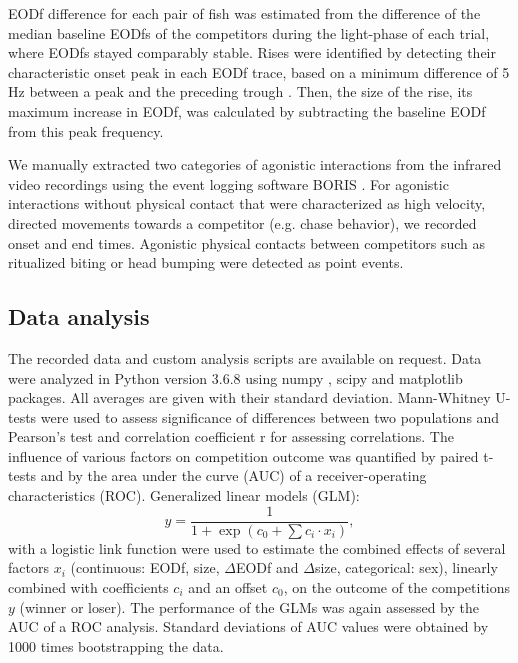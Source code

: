 EODf difference for each pair of fish was estimated from the difference of the median baseline EODfs of the competitors during the light-phase of each trial, where EODfs stayed comparably stable. Rises were identified by detecting their characteristic onset peak in
each EODf trace, based on a minimum difference of 5\,Hz between a peak and the preceding trough \citep{Todd1999}. Then, the size of the rise, its maximum increase in EODf, was calculated by subtracting the baseline EODf from this peak frequency.

We manually extracted two categories of agonistic interactions from the infrared video recordings using the event logging software BORIS \citep{Friard2016}. For agonistic interactions without physical contact that were characterized as high velocity, directed movements towards a competitor (e.g. chase behavior), we recorded onset and end times. Agonistic physical contacts between competitors such as ritualized biting or head bumping were detected as point events.

\subsection{Data analysis}

The recorded data and custom analysis scripts are available on request. Data were analyzed in Python version 3.6.8 using numpy \citep{vanderWalt2011}, scipy \citep{Oliphant2007} and matplotlib \citep{Hunter2007} packages. All averages are given with their standard deviation. Mann-Whitney U-tests were used to assess significance of differences between two populations and Pearson's test and correlation coefficient r for assessing correlations. The influence of various factors on competition outcome was quantified by paired t-tests and by the area under the curve (AUC) of a receiver-operating characteristics (ROC). Generalized linear models (GLM):
\begin{equation}
 \label{glmmodel}
 y = \frac{1}{1 + \exp{(c_0 + \sum c_i \cdot x_i)}},
\end{equation}
with a logistic link function were used to estimate the combined effects of several factors $x_i$ (continuous: EODf, size, $\Delta$EODf and $\Delta$size, categorical: sex), linearly combined with coefficients $c_i$ and an offset $c_0$, on the outcome of the competitions $y$ (winner or loser). The performance of the GLMs was again assessed by the AUC of a ROC analysis. Standard deviations of AUC values were obtained by 1000 times bootstrapping the data.

